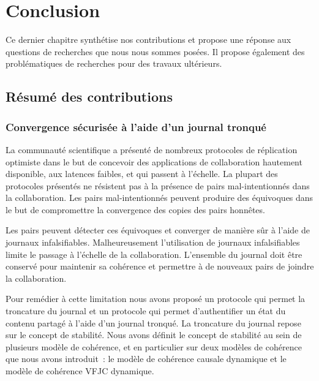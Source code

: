 
\chapter{Conclusion}\label{ch:conclusion}

\minitoc{}
\bigskip

Ce dernier chapitre synthétise nos contributions et propose une réponse aux questions de recherches que nous nous sommes posées.
Il propose également des problématiques de recherches pour des travaux ultérieurs.

\clearpage
\section{Résumé des contributions}


\subsection{Convergence sécurisée à l'aide d'un journal tronqué}

La communauté scientifique a présenté de nombreux protocoles de réplication optimiste dans le but de concevoir des applications de collaboration hautement disponible, aux latences faibles, et qui passent à l'échelle.
La plupart des protocoles présentés ne résistent pas à la présence de pairs mal-intentionnés dans la collaboration.
Les pairs mal-intentionnés peuvent produire des équivoques dans le but de compromettre la convergence des copies des pairs honnêtes.

Les pairs peuvent détecter ces équivoques et converger de manière sûr à l'aide de journaux infalsifiables.
Malheureusement l'utilisation de journaux infalsifiables limite le passage à l'échelle de la collaboration.
L'ensemble du journal doit être conservé pour maintenir sa cohérence et permettre à de nouveaux pairs de joindre la collaboration.

Pour remédier à cette limitation nous avons proposé un protocole qui permet la troncature du journal et un protocole qui permet d'authentifier un état du contenu partagé à l'aide d'un journal tronqué.
La troncature du journal repose sur le concept de stabilité.
Nous avons définit le concept de stabilité au sein de plusieurs modèle de cohérence, et en particulier sur deux modèles de cohérence que nous avons introduit~: le modèle de cohérence causale dynamique et le modèle de cohérence \acl{VFJC} dynamique.


